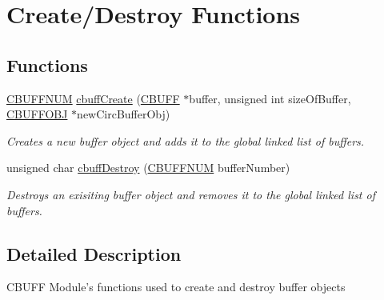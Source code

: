 \hypertarget{group___c_b_u_f_fcreate_destroy_functions}{
\section{Create/Destroy Functions}
\label{group___c_b_u_f_fcreate_destroy_functions}
}
\subsection*{Functions}
\begin{DoxyCompactItemize}
\item 
\hyperlink{group___c_b_u_f_fdata_types_gacaab9c1baaec5739b9e9629c51fd7258}{CBUFFNUM} \hyperlink{group___c_b_u_f_fcreate_destroy_functions_gaeeaed884818fd76417da6347fd033a44}{cbuffCreate} (\hyperlink{group___c_b_u_f_fdata_types_ga4c6278cce108e0ee8bb1b9c609d0cbf4}{CBUFF} $\ast$buffer, unsigned int sizeOfBuffer, \hyperlink{group___c_b_u_f_fdata_types_ga2cbf79f31747b0f5cf01750d1d42d12f}{CBUFFOBJ} $\ast$newCircBufferObj)
\begin{DoxyCompactList}\small\item\em Creates a new buffer object and adds it to the global linked list of buffers. \item\end{DoxyCompactList}\item 
unsigned char \hyperlink{group___c_b_u_f_fcreate_destroy_functions_ga27c64188592188aca24828740198f21c}{cbuffDestroy} (\hyperlink{group___c_b_u_f_fdata_types_gacaab9c1baaec5739b9e9629c51fd7258}{CBUFFNUM} bufferNumber)
\begin{DoxyCompactList}\small\item\em Destroys an exisiting buffer object and removes it to the global linked list of buffers. \item\end{DoxyCompactList}\end{DoxyCompactItemize}


\subsection{Detailed Description}
CBUFF Module's functions used to create and destroy buffer objects 

